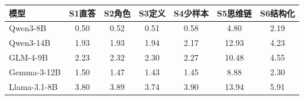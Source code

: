 \begin{tabular}{lcccccc}
\toprule
模型 & S1直答 & S2角色 & S3定义 & S4少样本 & S5思维链 & S6结构化 \\
\midrule
Qwen3-8B & 0.50 & 0.52 & 0.51 & 0.58 & 4.80 & 2.19 \\
Qwen3-14B & 1.93 & 1.93 & 1.94 & 2.17 & 12.93 & 4.23 \\
GLM-4-9B & 2.23 & 2.32 & 2.30 & 2.27 & 10.48 & 4.55 \\
Gemma-3-12B & 1.50 & 1.47 & 1.43 & 1.45 & 8.88 & 2.30 \\
Llama-3.1-8B & 3.80 & 3.89 & 3.74 & 3.90 & 13.94 & 5.91 \\
\bottomrule
\end{tabular}